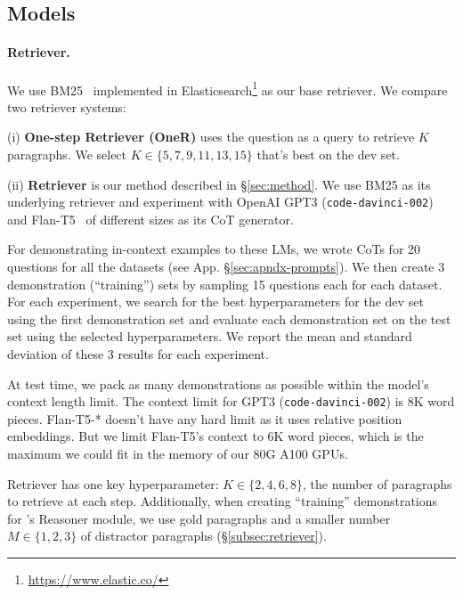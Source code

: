 \subsection{Models}
\label{subsec:exp-models}

\paragraph{Retriever.} We use BM25~\cite{bm25} implemented in Elasticsearch\footnote{\url{https://www.elastic.co/}} as our base retriever. We compare two retriever systems:

(i) \textbf{One-step Retriever (OneR)} uses the question as a query to retrieve $K$ paragraphs. We select $K \in \{5, 7, 9, 11, 13, 15\}$ that's best on the dev set.

(ii) \textbf{\iconsys Retriever} is our method described in \S\ref{sec:method}. We use BM25 as its underlying retriever and experiment with OpenAI GPT3 (\texttt{code-davinci-002})~\cite{originalgpt3,instructgpt3,codex} and Flan-T5~\cite{flan} of different sizes as its CoT generator.

For demonstrating in-context examples to these LMs, we wrote CoTs for 20 questions for all the datasets (see App. \S\ref{sec:apndx-prompts}). We then create 3 demonstration (``training'') sets by sampling 15 questions each for each dataset. For each experiment, we search for the best hyperparameters for the dev set using the first demonstration set and evaluate each demonstration set on the test set using the selected hyperparameters. We report the mean and standard deviation of these 3 results for each experiment.

 At test time, we pack as many demonstrations as possible within the model's context length limit. The context limit for GPT3 (\texttt{code-davinci-002}) is 8K word pieces. Flan-T5-* doesn't have any hard limit as it uses relative position embeddings. But we limit Flan-T5's context to 6K word pieces, which is the maximum we could fit in the memory of our 80G A100 GPUs.

\iconsys Retriever has one key hyperparameter: $K \in \{2, 4, 6, 8\}$, the number of paragraphs to retrieve at each step. Additionally, when creating ``training'' demonstrations for \iconsys's Reasoner module, we use gold paragraphs and a smaller number $M \in \{1, 2, 3\}$ of distractor paragraphs (\S\ref{subsec:retriever}).

